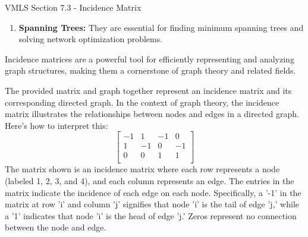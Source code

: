 \begin{notes}{VMLS Section 7.3 - Incidence Matrix}
\begin{enumerate}
        \item \textbf{Spanning Trees:} They are essential for finding minimum spanning trees and solving network optimization problems.
    \end{enumerate}

    Incidence matrices are a powerful tool for efficiently representing and analyzing graph structures, making them a cornerstone of graph theory and related fields.

    \begin{highlight}
        The provided matrix and graph together represent an incidence matrix and its corresponding directed graph. In the context of graph theory, the incidence matrix illustrates the relationships 
        between nodes and edges in a directed graph. Here's how to interpret this:
        \begin{equation*}
            \begin{bmatrix}
                -1 & 1 & -1 & 0 \\
                1 & -1 & 0 & -1 \\
                0 & 0 & 1 & 1 \\
            \end{bmatrix}
        \end{equation*}
        The matrix shown is an incidence matrix where each row represents a node (labeled 1, 2, 3, and 4), and each column represents an edge. The entries in the matrix indicate the incidence of each 
        edge on each node. Specifically, a '-1' in the matrix at row 'i' and column 'j' signifies that node 'i' is the tail of edge 'j,' while a '1' indicates that node 'i' is the head of edge 'j.' 
        Zeros represent no connection between the node and edge.
        \begin{center}
\end{center}
\end{highlight}
\end{notes}
